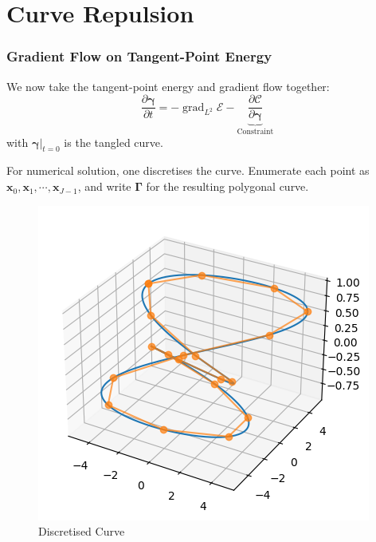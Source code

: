 \documentclass{beamer}
\theoremstyle{remark}
\newcommand{\gammabf}{\boldsymbol{\gamma}}
\newcommand{\Gammabf}{\boldsymbol{\Gamma}}
\newcommand{\xbf}{\mathbf{x}}
\DeclareMathOperator{\grad}{grad}
\begin{document}
\section{Curve Repulsion}
\begin{frame}
    \frametitle{Gradient Flow on Tangent-Point Energy}
    We now take the tangent-point energy and gradient flow together:
    \begin{equation}
        \frac{\partial \gammabf}{\partial t} = - \grad_{L^2} \mathcal{E} - \underbrace{\frac{\partial \mathcal{C}}{\partial \gammabf}}_{\text{Constraint}}
    \end{equation}
    with $\left.\gammabf\right|_{t=0}$ is the tangled curve.

        \begin{multicols}{2}
            {
                For numerical solution, one discretises the curve.
            }
            {
                Enumerate each point as $\xbf_0, \xbf_1, \cdots, \xbf_{J-1}$, and write
                $\Gammabf$ for the resulting polygonal curve.
            }
            \columnbreak
            {
                \begin{figure}[h]
                    \centering
                    \includegraphics[scale=0.4]{discretization}
                    \caption{Discretised Curve}
                \end{figure}
            }
        \end{multicols}
\end{frame}
\end{document}
